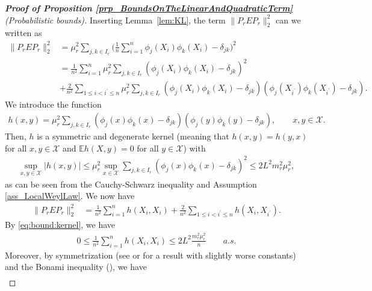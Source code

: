 \documentclass[a4paper,11pt]{article} %
\numberwithin{equation}{section}
\theoremstyle{definition}
\theoremstyle{remark}
\theoremstyle{plain}
\begin{document}
\begin{proof}[\normalfont \textbf{Proof of Proposition \ref{prp_BoundsOnTheLinearAndQuadraticTerm}} (Probabilistic bounds)]
  \label{prf_BoundsOnTheLinearAndQuadraticTerm}
  Inserting Lemma~\ref{lem:KL}, the term \( \| P_{r} E P_{r} \|_{2}^2 \) can we written as
    \begin{align}
        \| P_{r} E P_{r} \|_{2}^{2} 
    &= 
        \mu_{r}^{2} \sum_{ j, k \in I_{r} } 
                    \Big( \frac{1}{n} \sum_{ i = 1 }^{n} 
                          \phi_j(X_i) \phi_k(X_i) - \delta_{j k}
                    \Big)^{2}\\
    &= \frac{1}{n^2}\sum_{i=1}^n \mu_r^2\sum_{ j, k \in I_{r} } (\phi_j(X_i) \phi_k(X_i) - \delta_{j k})^2\\
    &+\frac{2}{n^2}\sum_{1\leq i<i^\prime\leq n} \mu_r^2\sum_{ j, k \in I_{r} }(\phi_j(X_i) \phi_k(X_i) - \delta_{j k})(\phi_j(X_{i^\prime}) \phi_k(X_{i^\prime}) - \delta_{j k}).
  \end{align}
  We introduce the function
  \begin{align}
      h(x,y)=\mu_r^2\sum_{ j, k \in I_{r} }(\phi_j(x) \phi_k(x) - \delta_{j k})(\phi_j(y) \phi_k(y) - \delta_{j k}),\qquad x,y\in\mathcal{X}.
  \end{align}
  Then, $h$ is a symmetric and degenerate kernel (meaning that $h(x,y)=h(y,x)$ for all $x,y\in\mathcal{X}$ and $\mathbb{E}h(X,y)=0$ for all $y\in\mathcal{X}$) with
  \begin{align}\label{eq:bound:kernel}
      \sup_{x,y\in\mathcal{X}}|h(x,y)|\leq \mu_r^2\sup_{x\in\mathcal{X}}\sum_{ j, k \in I_{r} }(\phi_j(x) \phi_k(x) - \delta_{j k})^2\leq 2L^2m_r^2\mu_r^2,
  \end{align}
  as can be seen from the Cauchy-Schwarz inequality and Assumption \ref{ass_LocalWeylLaw}. We now have 
  \begin{align}
      \| P_{r} E P_{r} \|_{2}^{2}&=\frac{1}{n^2}\sum_{i=1}^n h(X_i,X_i)+\frac{2}{n^2}\sum_{1\leq i<i^\prime\leq n} h(X_i,X_{i^\prime}).
  \end{align}
  By \eqref{eq:bound:kernel}, we have
  \begin{align}\label{eq:HD:1}
      0\leq \frac{1}{n^2}\sum_{i=1}^n h(X_i,X_i)\leq 2L^2\frac{m_r^2\mu_r^2}{n}\qquad a.s.
  \end{align}
  Moreover, by symmetrization (see \cite{SCK19} or \cite[Theorem 3.1]{PG99} for a result with slightly worse constants) and the Bonami inequality (\cite[Theorem 3.22]{PG99}), we have 
    \begin{align}

\end{align}
\end{proof}
\end{document}
